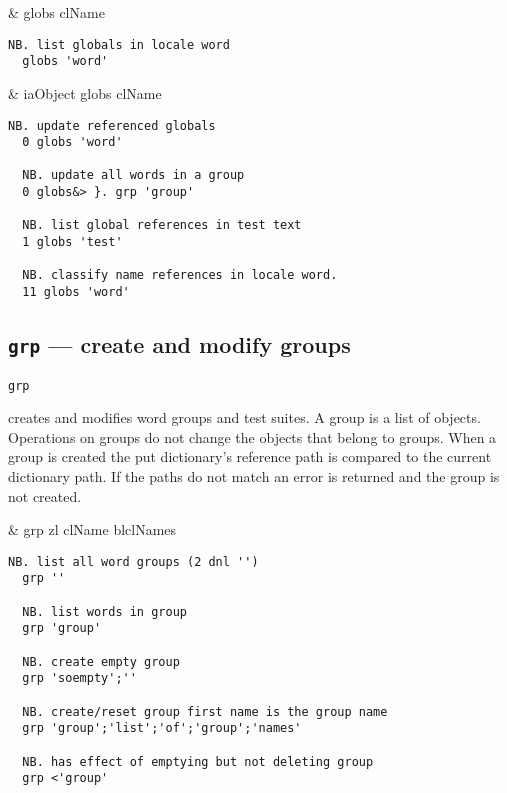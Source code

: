 \begin{wordhead}
\monad & globs clName \\
\end{wordhead}
\begin{lstlisting}[frame=single,framerule=0pt] 
  NB. list globals in locale word 
  globs 'word' 
\end{lstlisting}

\begin{wordhead}
\dyad & iaObject globs clName \\
\end{wordhead}
\begin{lstlisting}[frame=single,framerule=0pt] 
  NB. update referenced globals
  0 globs 'word' 

  NB. update all words in a group
  0 globs&> }. grp 'group' 

  NB. list global references in test text
  1 globs 'test'           

  NB. classify name references in locale word. 
  11 globs 'word'  
\end{lstlisting}


\subsection{\texttt{grp} --- create and modify groups}\label{ss:grp}

\hypertarget{il:grp}{\texttt{grp}} creates and modifies word groups
 and test suites. A group is a list of objects. Operations on groups do not change 
 the objects that belong to groups. When a group is created the
 put dictionary's reference path is compared to the current dictionary path. 
 If the paths do not match an error is returned and the group is not created. 

\begin{wordhead}
\monad & grp zl \argsep clName \argsep blclNames \\
\end{wordhead}
\begin{lstlisting}[frame=single,framerule=0pt] 
  NB. list all word groups (2 dnl '')
  grp ''    
  
  NB. list words in group    
  grp 'group'  
  
  NB. create empty group 
  grp 'soempty';''

  NB. create/reset group first name is the group name
  grp 'group';'list';'of';'group';'names'

  NB. has effect of emptying but not deleting group 
  grp <'group' 
\end{lstlisting}

